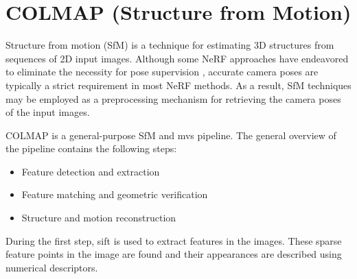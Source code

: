 


\section{COLMAP (Structure from Motion)} \label{sec:colmap}
Structure from motion (SfM) is a technique for estimating 3D structures from sequences of 2D input images. Although some NeRF approaches have  endeavored to eliminate the necessity for pose supervision \cite{lin_barf_2021}\cite{wang_nerf--_2022}, accurate camera poses are typically a strict requirement in most NeRF methods. As a result, SfM techniques may be employed as a preprocessing mechanism for retrieving the camera poses of the input images.



COLMAP is a general-purpose SfM \cite{schoenberger2016sfm} and \acrfull{mvs} \cite{schoenberger2016mvs} pipeline. The general overview of the pipeline contains the following steps:
\begin{itemize}
    \item Feature detection and extraction
    \item Feature matching and geometric verification
    \item Structure and motion reconstruction
\end{itemize}

During the first step, \acrfull{sift} \cite{Lowe2004} is used to extract features in the images. These sparse feature points in the image are found and their appearances are described using numerical descriptors.


